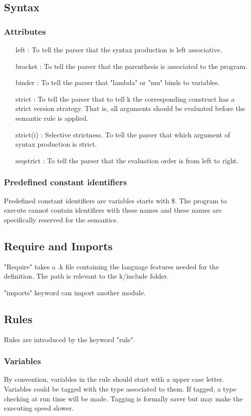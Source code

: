 \documentclass[a4paper]{article}
\begin{document}
\subsection{Syntax}
\subsubsection{Attributes}
\begin{itemize}
    \item [left]: To tell the parser that the syntax production is left associative.
    \item [bracket]: To tell the parser that the parenthesis is associated to the program.
    \item [binder]: To tell the parser that "lambda" or "mu" binds to variables.
    \item [strict]: To tell the parser that to tell k the corresponding construct has a strict version strategy. That is, all arguments should be evaluated before the semantic rule is applied.
    \item [strict(i)]: Selective strictness. To tell the parser that which argument of syntax production is strict.
    \item [seqstrict]: To tell the parser that the evaluation order is from left to right.
\end{itemize}

\subsubsection{Predefined constant identifiers}
Predefined constant identifiers are variables starts with \$. The program to execute cannot contain identifiers with these names and these names are specifically reserved for the semantics.

\subsection{Require and Imports}
"Require" takes a .k file containing the language features needed for the definition. The path is relevant to the k/include folder.

"imports" keyword can import another module.

\subsection{Rules}
Rules are introduced by the keyword "rule".
\subsubsection{Variables}
By convention, variables in the rule should start with a upper case letter. Variables could be tagged with the type associated to them. If tagged, a type checking at run time will be made. Tagging is formally saver but may make the executing speed slower.
\end{document}
